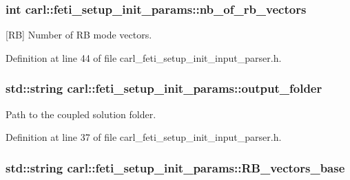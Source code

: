 \subsubsection[{nb\+\_\+of\+\_\+rb\+\_\+vectors}]{\setlength{\rightskip}{0pt plus 5cm}int carl\+::feti\+\_\+setup\+\_\+init\+\_\+params\+::nb\+\_\+of\+\_\+rb\+\_\+vectors}\label{structcarl_1_1feti__setup__init__params_a29d1a28ace280fb7fc2b7194fd9cea4a}


\mbox{[}R\+B\mbox{]} Number of R\+B mode vectors. 



Definition at line 44 of file carl\+\_\+feti\+\_\+setup\+\_\+init\+\_\+input\+\_\+parser.\+h.

\hypertarget{structcarl_1_1feti__setup__init__params_a30b5ce1bab947467d4bde48cf1fd0f67}{}
\subsubsection[{output\+\_\+folder}]{\setlength{\rightskip}{0pt plus 5cm}std\+::string carl\+::feti\+\_\+setup\+\_\+init\+\_\+params\+::output\+\_\+folder}\label{structcarl_1_1feti__setup__init__params_a30b5ce1bab947467d4bde48cf1fd0f67}


Path to the coupled solution folder. 



Definition at line 37 of file carl\+\_\+feti\+\_\+setup\+\_\+init\+\_\+input\+\_\+parser.\+h.

\hypertarget{structcarl_1_1feti__setup__init__params_aa70293e2d51c3475ebbdda0e338e8bbb}{}
\subsubsection[{R\+B\+\_\+vectors\+\_\+base}]{\setlength{\rightskip}{0pt plus 5cm}std\+::string carl\+::feti\+\_\+setup\+\_\+init\+\_\+params\+::\+R\+B\+\_\+vectors\+\_\+base}\label{structcarl_1_1feti__setup__init__params_aa70293e2d51c3475ebbdda0e338e8bbb}


